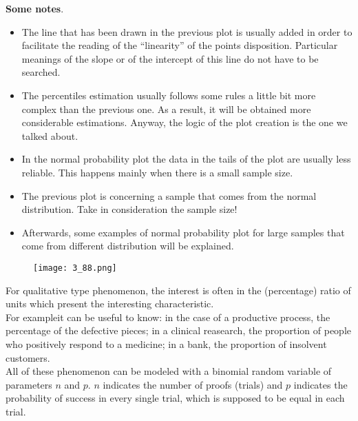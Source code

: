 \begin{frame}
  \begin{small}
    \textbf{Some notes}.
    \begin{itemize}
      \item The line that has been drawn in the previous plot is usually added in order to facilitate the reading of the ``linearity'' of the points disposition. Particular meanings of the slope or of the intercept of this line do not have to be searched.
      \item The percentiles estimation usually follows some rules a little bit more complex than the previous one. As a result, it will be obtained more considerable estimations. Anyway, the logic of the plot creation is the one we talked about.
      \item  In the normal probability plot the data in the tails of the plot are usually less reliable. This happens mainly when there is a small sample size.
      \item The previous plot is concerning a sample that comes from the normal distribution. Take in consideration the sample size!
      \item Afterwards, some examples of normal probability plot for large samples that come from different distribution will be explained.
    \end{itemize}
  \end{small}
\end{frame}

\begin{frame}
  \vspace*{.25cm}
  \begin{figure}
    \texttt{[image: 3\_88.png]}
  \end{figure}
\end{frame}





\begin{frame}
  \vspace*{.75cm}
  For qualitative type phenomenon, the interest is often in the (percentage) ratio of units which present the interesting characteristic.\\
  \vspace*{.5cm}
  For exampleit can be useful to know: in the case of a productive process, the percentage of the defective pieces; in a clinical reasearch, the proportion of people who positively respond to a medicine; in a bank, the proportion of insolvent customers.\\
  \vspace*{.5cm}
  All of these phenomenon can be modeled with a binomial random variable of parameters $ n $ and $ p $. $ n $ indicates the number of proofs (trials) and $ p $ indicates the probability of success in every single trial, which is supposed to be equal in each trial.\\
\end{frame}

